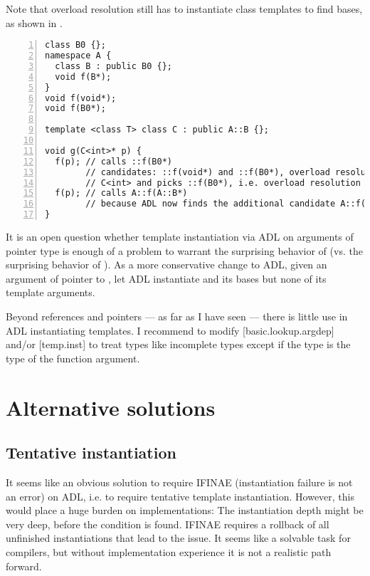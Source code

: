 Note that overload resolution still has to instantiate class templates to find bases, as 
shown in .
\begin{lstlisting}[style=Vc,numbers=left,float,label=lst:instantiateOverloadResolution,caption={
Class template instantiation on overload resolution if ADL does not instantiate \code{C<int>}
}]
class B0 {};
namespace A {
  class B : public B0 {};
  void f(B*);
}
void f(void*);
void f(B0*);

template <class T> class C : public A::B {};

void g(C<int>* p) {
  f(p); // calls ::f(B0*)
        // candidates: ::f(void*) and ::f(B0*), overload resolution instantiates
        // C<int> and picks ::f(B0*), i.e. overload resolution works unchanged
  f(p); // calls A::f(A::B*)
        // because ADL now finds the additional candidate A::f(A::B*)
}
\end{lstlisting}
It is an open question whether template instantiation via ADL on arguments of pointer type 
is enough of a problem to warrant the surprising behavior of 
 (vs. the surprising behavior of ). As a 
more conservative change to ADL, given an argument of pointer to , let ADL 
instantiate  and its bases but none of its template arguments.

Beyond references and pointers --- as far as I have seen --- there is little use in ADL 
instantiating templates. I recommend to modify [basic.lookup.argdep] and/or [temp.inst] to 
treat \notyetinstantiated types like incomplete types except if the \notyetinstantiated 
type is the type of the function argument.

\section{Alternative solutions}

\subsection{Tentative instantiation}
It seems like an obvious solution to require IFINAE (instantiation failure is not an 
error) on ADL, i.e. to require tentative template instantiation. However, this would place 
a huge burden on implementations: The instantiation depth might be very deep, before the 
condition is found. IFINAE requires a rollback of all unfinished instantiations that lead 
to the issue. It seems like a solvable task for compilers, but without implementation 
experience it is not a realistic path forward.

